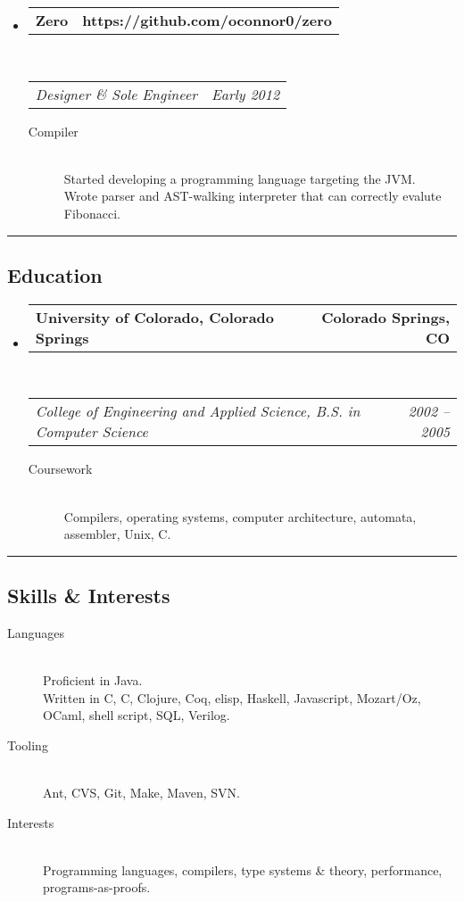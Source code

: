 \documentclass[10pt,letterpaper]{article}
\makeatletter
\newenvironment{indentsection}[1]%
{\begin{list}{}%
	{\setlength{\leftmargin}{#1}}%
	\item[]%
}
{\end{list}}
\newcommand{\headerrow}[2]
{\begin{tabular*}{\linewidth}{l@{\extracolsep{\fill}}r}
	#1 &
	#2 \\
\end{tabular*}}
\newcommand{\CPP}
{C\nolinebreak[4]\hspace{-.05em}\raisebox{.22ex}{\footnotesize\bf ++}}
\makeatother
\begin{document}
\begin{itemize}
	\item
	\headerrow
		{\textbf{Zero}}
		{\textbf{https://github.com/oconnor0/zero}}
	\\
	\headerrow
		{\emph{Designer \& Sole Engineer}}
		{\emph{Early 2012}}
	\begin{description}
		\item[Compiler] \hfill \\
			Started developing a programming language targeting the JVM. \\
			Wrote parser and AST-walking interpreter that can correctly evalute Fibonacci.
	\end{description}

\end{itemize}

\hrule
\vspace{-0.4em}
\subsection*{Education}

\begin{itemize}
	\parskip=0.1em

	\item
	\headerrow
		{\textbf{University of Colorado, Colorado Springs}}
		{\textbf{Colorado Springs, CO}}
	\\
	\headerrow
		{\emph{College of Engineering and Applied Science, B.S. in Computer Science}}
		{\emph{2002 -- 2005}}
	\begin{description}
		\item[Coursework] \hfill \\
			Compilers, operating systems, computer architecture, automata, assembler, Unix, C.
	\end{description}

\end{itemize}


\hrule
\vspace{-0.4em}
\subsection*{Skills \& Interests}

\begin{indentsection}{\parindent}
\begin{description}
	\item[Languages] \hfill \\
	Proficient in Java. \\
	Written in C, \CPP, Clojure, Coq, elisp, Haskell, Javascript, Mozart/Oz, OCaml, shell script, SQL, Verilog.
	\item[Tooling] \hfill \\
	Ant, CVS, Git, Make, Maven, SVN.
	\item[Interests] \hfill \\
	Programming languages, compilers, type systems \& theory, performance, programs-as-proofs.
\end{description}
\end{indentsection}
\end{document}

